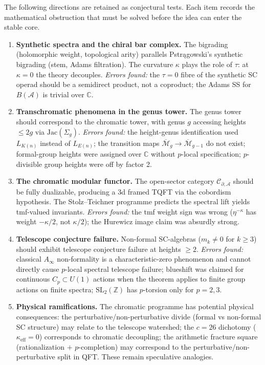 \documentclass[11pt]{article}
\newcommand{\cA}{\mathcal{A}}
\newcommand{\cC}{\mathcal{C}}
\newcommand{\cM}{\mathcal{M}}
\newcommand{\C}{\mathbb{C}}
\newcommand{\Z}{\mathbb{Z}}
\begin{document}
The following directions are retained as conjectural tests.  Each item
records the mathematical obstruction that must be solved before the idea
can enter the stable core.

\begin{enumerate}
\item \textbf{Synthetic spectra and the chiral bar complex.}
  The bigrading (holomorphic weight, topological arity) parallels
  Pstr\k{a}gowski's synthetic bigrading (stem, Adams filtration).
  The curvature $\kappa$ plays the role of $\tau$: at $\kappa = 0$ the
  theory decouples.  \emph{Errors found:} the $\tau = 0$ fibre of the
  synthetic SC operad should be a semidirect product, not a coproduct;
  the Adams SS for $B(\cA)$ is trivial over $\C$.

\item \textbf{Transchromatic phenomena in the genus tower.}
  The genus tower should correspond to the chromatic tower, with
  genus $g$ accessing heights $\le 2g$ via $\mathrm{Jac}(\Sigma_g)$.
  \emph{Errors found:} the height-genus identification used $L_{K(n)}$
  instead of $L_{E(n)}$; the transition maps
  $\overline{\cM}_g \to \overline{\cM}_{g-1}$ do not exist;
  formal-group heights were assigned over $\C$ without $p$-local
  specification; $p$-divisible group heights were off by factor 2.

\item \textbf{The chromatic modular functor.}
  The open-sector category $\cC_{\partial,\cA}$ should be fully
  dualizable, producing a 3d framed TQFT via the cobordism hypothesis.
  The Stolz--Teichner programme predicts the spectral lift yields
  tmf-valued invariants.  \emph{Errors found:} the tmf weight sign was
  wrong ($\eta^{-\kappa}$ has weight $-\kappa/2$, not $\kappa/2$); the
  Hurewicz image claim was absurdly strong.

\item \textbf{Telescope conjecture failure.}
  Non-formal SC-algebras ($m_k \ne 0$ for $k \ge 3$) should exhibit
  telescope conjecture failure at heights $\ge 2$.  \emph{Errors found:}
  classical $A_\infty$ non-formality is a characteristic-zero phenomenon
  and cannot directly cause $p$-local spectral telescope failure;
  blueshift was claimed for continuous $C_p \subset U(1)$ actions when
  the theorem applies to finite group actions on finite spectra;
  $\mathrm{SL}_2(\Z)$ has $p$-torsion only for $p = 2, 3$.

\item \textbf{Physical ramifications.}
  The chromatic programme has potential physical consequences:
  the perturbative/non-perturbative divide (formal vs non-formal SC
  structure) may relate to the telescope watershed; the
  $c = 26$ dichotomy ($\kappa_{\mathrm{eff}} = 0$) corresponds to
  chromatic decoupling; the arithmetic fracture square (rationalization
  $+$ $p$-completion) may correspond to the perturbative/non-perturbative
  split in QFT.  These remain speculative analogies.
\end{enumerate}
\end{document}

